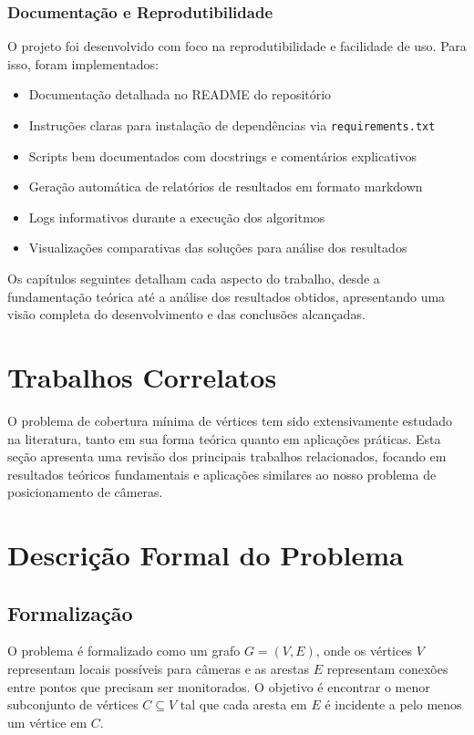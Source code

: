 \documentclass[12pt, a4paper]{report}
\begin{document}
\subsection{Documentação e Reprodutibilidade}
O projeto foi desenvolvido com foco na reprodutibilidade e facilidade de uso. Para isso, foram implementados:

\begin{itemize}
    \item Documentação detalhada no README do repositório
    \item Instruções claras para instalação de dependências via \texttt{requirements.txt}
    \item Scripts bem documentados com docstrings e comentários explicativos
    \item Geração automática de relatórios de resultados em formato markdown
    \item Logs informativos durante a execução dos algoritmos
    \item Visualizações comparativas das soluções para análise dos resultados
\end{itemize}

Os capítulos seguintes detalham cada aspecto do trabalho, desde a fundamentação teórica até a análise dos resultados obtidos, apresentando uma visão completa do desenvolvimento e das conclusões alcançadas.

\chapter{Trabalhos Correlatos}
O problema de cobertura mínima de vértices tem sido extensivamente estudado na literatura, tanto em sua forma teórica quanto em aplicações práticas. Esta seção apresenta uma revisão dos principais trabalhos relacionados, focando em resultados teóricos fundamentais e aplicações similares ao nosso problema de posicionamento de câmeras.

\chapter{Descrição Formal do Problema}

\section{Formalização}
O problema é formalizado como um grafo \(G = (V, E)\), onde os vértices \(V\) representam locais possíveis para câmeras e as arestas \(E\) representam conexões entre pontos que precisam ser monitorados. O objetivo é encontrar o menor subconjunto de vértices \(C \subseteq V\) tal que cada aresta em \(E\) é incidente a pelo menos um vértice em \(C\).
\end{document}
